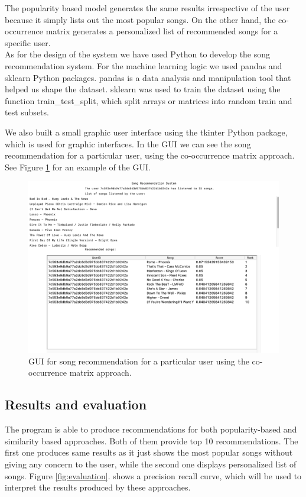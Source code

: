 \documentclass{jot}
\begin{document}
The popularity based model generates the same results irrespective of the user because it simply lists out the most popular songs. On the other hand, the co-occurrence matrix generates a personalized list of recommended songs for a specific user.\\

As for the design of the system we have used Python to develop the song recommendation system. For the machine learning logic we used pandas and sklearn Python packages. pandas is a data analysis and manipulation tool that helped us shape the dataset. sklearn was used to train the dataset using the function train\_test\_split, which split arrays or matrices into random train and test subsets.

We also built a small graphic user interface using the tkinter Python package, which is used for graphic interfaces. In the GUI we can see the song recommendation for a particular user, using the co-occurrence matrix approach. See Figure \ref{fig:design} for an example of the GUI.

\begin{figure}[h!]
    \centering%
    \includegraphics[width=\textwidth]{design}
    \caption{GUI for song recommendation for a particular user using the co-occurrence matrix approach.}
    \label{fig:design}
\end{figure}%

\subsection{Results and evaluation}
The program is able to produce recommendations for both popularity-based and similarity based approaches. Both of them provide top 10 recommendations. The first one produces same results as it just shows the most popular songs without giving any concern to the user, while the second one displays personalized  list of songs.
Figure \ref{fig:evaluation}. shows a precision recall curve, which will be used to interpret the results produced by these approaches.\\
\end{document}
